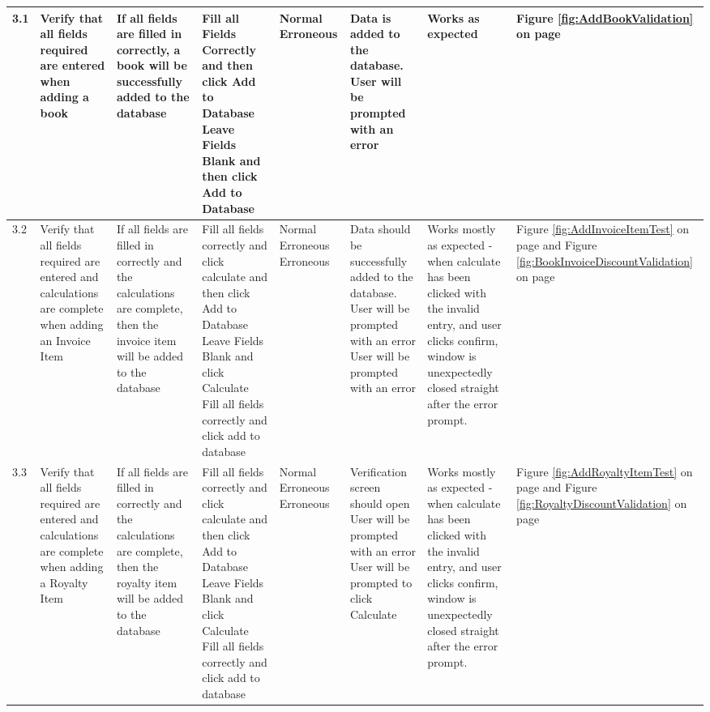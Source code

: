\begin{landscape}
\begin{center}
\begin{longtable}{|p{1.5cm}|p{2cm}|p{2.5cm}|p{2.5cm}|p{2cm}|p{2cm}|p{2cm}|p{2cm}|}
        3.1 & Verify that all fields required are entered when adding a book & If all fields are filled in correctly, a book will be successfully added to the database & Fill all Fields Correctly and then click Add to Database \newline Leave Fields Blank and then click Add to Database & Normal \newline Erroneous & Data is added to the database. \newline User will be prompted with an error & Works as expected & Figure \ref{fig:AddBookValidation} on page \pageref{fig:AddBookValidation} \\ \hline
        3.2 & Verify that all fields required are entered and calculations are complete when adding an Invoice Item & If all fields are filled in correctly and the calculations are complete, then the invoice item will be added to the database & Fill all fields correctly and click calculate and then click Add to Database \newline Leave Fields Blank and click Calculate \newline Fill all fields correctly and click add to database & Normal \newline Erroneous \newline Erroneous & Data should be successfully added to the database. \newline User will be prompted with an error \newline User will be prompted with an error & Works mostly as expected - when calculate has been clicked with the invalid entry, and user clicks confirm, window is unexpectedly closed straight after the error prompt. & Figure \ref{fig:AddInvoiceItemTest} on page \pageref{fig:AddInvoiceItemTest} and Figure \ref{fig:BookInvoiceDiscountValidation} on page \pageref{fig:BookInvoiceDiscountValidation} \\ \hline
        3.3 & Verify that all fields required are entered and calculations are complete when adding a Royalty Item & If all fields are filled in correctly and the calculations are complete, then the royalty item will be added to the database & Fill all fields correctly and click calculate and then click Add to Database \newline Leave Fields Blank and click Calculate \newline Fill all fields correctly and click add to database & Normal \newline Erroneous \newline Erroneous & Verification screen should open \newline User will be prompted with an error \newline User will be prompted to click Calculate & Works mostly as expected - when calculate has been clicked with the invalid entry, and user clicks confirm, window is unexpectedly closed straight after the error prompt. & Figure \ref{fig:AddRoyaltyItemTest} on page \pageref{fig:AddRoyaltyItemTest} and Figure \ref{fig:RoyaltyDiscountValidation} on page \pageref{fig:RoyaltyDiscountValidation} \\ \hline

\end{longtable}
\end{center}
\end{landscape}
